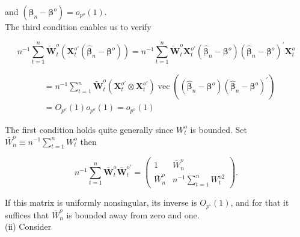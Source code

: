 \documentclass[10pt]{article}
\begin{document}
and $\left(\hat{\boldsymbol{\beta}}_{n}-\boldsymbol{\beta}^{o}\right)=o_{p^{o}}(1)$.\\
The third condition enables us to verify

$$
n^{-1} \sum_{t=1}^{n} \tilde{\mathbf{W}}_{t}^{o}\left(\mathbf{X}_{t}^{o \prime}\left(\hat{\boldsymbol{\beta}}_{n}-\boldsymbol{\beta}^{o}\right)\right)=n^{-1} \sum_{t=1}^{n} \tilde{\mathbf{W}}_{t}^{o} \mathbf{X}_{t}^{o \prime}\left(\hat{\boldsymbol{\beta}}_{n}-\boldsymbol{\beta}^{o}\right)\left(\hat{\boldsymbol{\beta}}_{n}-\boldsymbol{\beta}^{o}\right)^{\prime} \mathbf{X}_{t}^{o}
$$

$$
\begin{aligned}
& =n^{-1} \sum_{t=1}^{n} \tilde{\mathbf{W}}_{t}^{o}\left(\mathbf{X}_{t}^{o \prime} \otimes \mathbf{X}_{t}^{o \prime}\right) \operatorname{vec}\left(\left(\hat{\boldsymbol{\beta}}_{n}-\boldsymbol{\beta}^{o}\right)\left(\hat{\boldsymbol{\beta}}_{n}-\boldsymbol{\beta}^{o}\right)^{\prime}\right) \\
& =O_{p^{o}}(1) o_{p^{o}}(1)=o_{p^{o}}(1)
\end{aligned}
$$

The first condition holds quite generally since $W_{t}^{o}$ is bounded. Set $\bar{W}_{n}^{o} \equiv n^{-1} \sum_{t=1}^{n} W_{t}^{o}$ then

$$
n^{-1} \sum_{t=1}^{n} \overline{\mathbf{W}}_{t}^{o} \overline{\mathbf{W}}_{t}^{o \prime}=\left(\begin{array}{cc}
1 & \bar{W}_{n}^{o} \\
\bar{W}_{n}^{o} & n^{-1} \sum_{t=1}^{n} W_{t}^{o 2}
\end{array}\right) .
$$

If this matrix is uniformly nonsingular, its inverse is $O_{p^{\circ}}(1)$, and for that it suffices that $\bar{W}_{n}^{o}$ is bounded away from zero and one.\\
(ii) Consider
\end{document}
